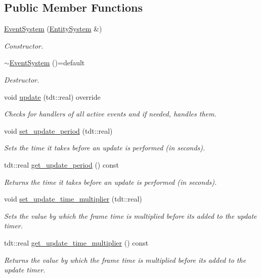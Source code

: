 \subsection*{Public Member Functions}
\begin{DoxyCompactItemize}
\item 
\hyperlink{class_event_system_ae91be44668c9249f29574330794877a6}{Event\+System} (\hyperlink{class_entity_system}{Entity\+System} \&)
\begin{DoxyCompactList}\small\item\em Constructor. \end{DoxyCompactList}\item 
\hyperlink{class_event_system_aaaa3ccbd5dfadfb47d49fd33a2fbc952}{$\sim$\+Event\+System} ()=default
\begin{DoxyCompactList}\small\item\em Destructor. \end{DoxyCompactList}\item 
void \hyperlink{class_event_system_a1410963080a61fdbafc406100dc17d8d}{update} (tdt\+::real) override
\begin{DoxyCompactList}\small\item\em Checks for handlers of all active events and if needed, handles them. \end{DoxyCompactList}\item 
void \hyperlink{class_event_system_a1659caf05f63eaedd1513186574f4292}{set\+\_\+update\+\_\+period} (tdt\+::real)
\begin{DoxyCompactList}\small\item\em Sets the time it takes before an update is performed (in seconds). \end{DoxyCompactList}\item 
tdt\+::real \hyperlink{class_event_system_a1eef89ae00d5f8653c7efe6abeaa40b0}{get\+\_\+update\+\_\+period} () const 
\begin{DoxyCompactList}\small\item\em Returns the time it takes before an update is performed (in seconds). \end{DoxyCompactList}\item 
void \hyperlink{class_event_system_a52087f3b87b190e9cc98cd70b5cbd02d}{set\+\_\+update\+\_\+time\+\_\+multiplier} (tdt\+::real)
\begin{DoxyCompactList}\small\item\em Sets the value by which the frame time is multiplied before it\textquotesingle{}s added to the update timer. \end{DoxyCompactList}\item 
tdt\+::real \hyperlink{class_event_system_ac988bff372a77468dac5fa9b5d9c99ff}{get\+\_\+update\+\_\+time\+\_\+multiplier} () const 
\begin{DoxyCompactList}\small\item\em Returns the value by which the frame time is multiplied before it\textquotesingle{}s added to the update timer. \end{DoxyCompactList}\end{DoxyCompactItemize}
